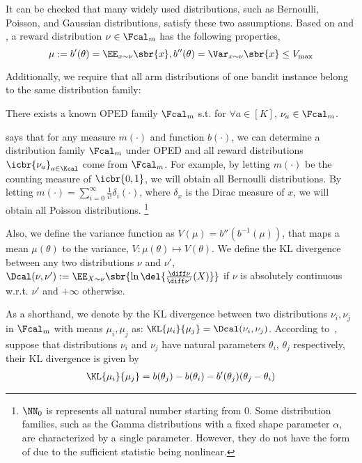It can be checked that many widely used distributions, such as Bernoulli, Poisson, and Gaussian distributions, satisfy these two assumptions.
Based on  and , a reward distribution $\nu \in \Fcal_m$ has the following properties,
    \[
        \mu := b'(\theta) = \EE_{x \sim \nu}\sbr{ x }, 
        b''(\theta) = \Var_{x \sim \nu}\sbr{x} \leq V_{\max}
    \]

Additionally, we require that all arm distributions of one bandit instance belong to the same distribution family:

\begin{assum} \label{assum:reward-dist}
    There exists a known OPED family $\Fcal_m$ s.t. for $\forall a \in [K]$, $\nu_a \in \Fcal_m$.
\end{assum}

 says that for any measure $m(\cdot)$ and function $b(\cdot)$, we can determine a distribution family $\Fcal_m$ under OPED and all reward distributions $\icbr{\nu_a}_{a\in\Kcal}$ come from $\Fcal_m$.
For example, by letting $m(\cdot)$ be the counting measure of $\icbr{0, 1}$, we will obtain all Bernoulli distributions.
By letting $m(\cdot) = \sum_{i=0}^\infty \frac{1}{i!} \delta_{i}(\cdot)$, where $\delta_x$ is the Dirac measure of $x$, we will obtain all Poisson distributions.
\footnote{$\NN_0$ is represents all natural number starting from $0$. Some distribution families, such as the Gamma distributions with a fixed shape parameter $\alpha$, are characterized by a single parameter. However, they do not have the form of  due to the sufficient statistic being nonlinear. 
}


Also, we define the variance function as $V(\mu) = b''(b^{-1}(\mu))$, that maps a mean $\mu(\theta)$ to the variance, $V: \mu(\theta) \mapsto V(\theta)$. 
We define the KL divergence between any two distributions $\nu$ and $\nu'$, $\Dcal(\nu, \nu'):= \EE_{X\sim \nu} \sbr{ \ln\del{\tfrac{\diff \nu}{\diff \nu'}(X)} }$ if $\nu$ is absolutely continuous w.r.t. $\nu'$ and $+\infty$ otherwise.

As a shorthand, we denote by the KL divergence between two distributions $\nu_i, \nu_j$ in $\Fcal_m$ with means $\mu_i, \mu_j$ as: 
$\KL{\mu_i}{\mu_j} = \Dcal(\nu_i, \nu_j)$.
According to~\citet{lehmann2006theory}, suppose that distributions $\nu_i$ and $\nu_j$ have natural parameters $\theta_i$, $\theta_j$ respectively, their KL divergence is given by
\begin{align}
    \KL{\mu_i}{\mu_j} = b(\theta_j) - b(\theta_i) - b'(\theta_j)(\theta_j-\theta_i)
    \label{eqn:KL-eqn}
\end{align}

